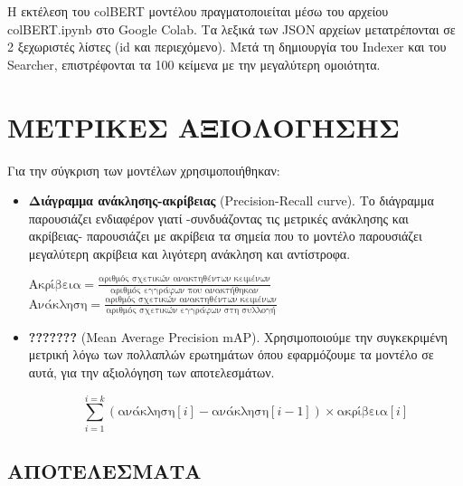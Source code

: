 ﻿\documentclass[12pt]{report}
\begin{document}
            Η εκτέλεση του colBERT μοντέλου πραγματοποιείται μέσω του αρχείου {\fontCode\small colBERT.ipynb} στο Google Colab.
            Τα λεξικά των JSON αρχείων μετατρέπονται σε 2 ξεχωριστές λίστες (id και περιεχόμενο). Μετά τη δημιουργία του Indexer και του Searcher,
            επιστρέφονται τα 100 κείμενα με την μεγαλύτερη ομοιότητα.

        \chapter{ΜΕΤΡΙΚΕΣ ΑΞΙΟΛΟΓΗΣΗΣ}
            Για την σύγκριση των μοντέλων χρησιμοποιήθηκαν:
            \begin{itemize}
                \item \textbf{Διάγραμμα ανάκλησης-ακρίβειας} {\fontTimes(Precision-Recall curve)}. Το διάγραμμα παρουσιάζει ενδιαφέρον γιατί -συνδυάζοντας τις μετρικές ανάκλησης και ακρίβειας-
            παρουσιάζει με ακρίβεια τα σημεία που το μοντέλο παρουσιάζει μεγαλύτερη ακρίβεια και λιγότερη ανάκληση και αντίστροφα.

                \begin{multicols}{2} \centering
                    \( \text{Ακρίβεια} = \frac{\text{αριθμός σχετικών ανακτηθέντων κειμένων}}{\text{αριθμός εγγράφων που ανακτήθηκαν}} \) \\
                    \( \text{Ανάκληση} = \frac{\text{αριθμός σχετικών ανακτηθέντων κειμένων}}{\text{αριθμός σχετικών εγγράφων στη συλλογή}} \)
                \end{multicols}

                \item \textbf{???????} {\fontTimes (Mean Average Precision \textendash\hspace{1pt} mAP)}. Χρησιμοποιούμε την συγκεκριμένη μετρική λόγω των πολλαπλών ερωτημάτων όπου εφαρμόζουμε τα μοντέλο σε αυτά, για την αξιολόγηση των αποτελεσμάτων.

                    \begin{displaymath}
                        \sum_{i=1}^{i=k}(\text{ανάκληση}[i] - \text{ανάκληση}[i-1])\times\text{ακρίβεια}[i]
                    \end{displaymath}
            \end{itemize}

            \section{\hspace{1pt}ΑΠΟΤΕΛΕΣΜΑΤΑ\hspace{1pt}}
\end{document}
